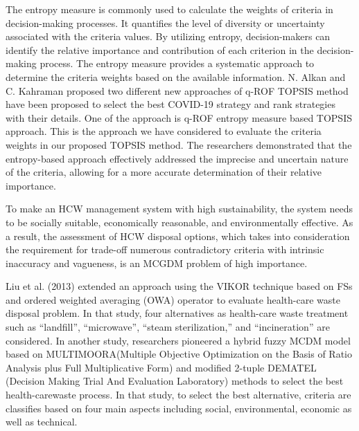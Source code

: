 \begin{flushleft}
\vspace{5mm}

The entropy measure is commonly used to calculate the weights of criteria in decision-making processes. It quantifies the level of diversity or uncertainty associated with the criteria values. By utilizing entropy, decision-makers can identify the relative importance and contribution of each criterion in the decision-making process. The entropy measure provides a systematic approach to determine the criteria weights based on the available information. 
N. Alkan and C. Kahraman\cite{1} proposed two different new approaches of q-ROF TOPSIS
method have been proposed to select the best COVID-19 strategy
and rank strategies with their details. One of the approach is q-ROF entropy measure based TOPSIS approach. This is the approach we have considered to evaluate the criteria weights in our proposed TOPSIS method. The researchers demonstrated that the entropy-based approach effectively addressed the imprecise and uncertain nature of the criteria, allowing for a more accurate determination of their relative importance.

\vspace{5mm}

To make an HCW management system with high
sustainability, the system needs to be socially suitable, economically
reasonable, and environmentally effective\cite{8}. As a result, the assessment of HCW disposal options,
which takes into consideration the requirement for trade-off
numerous contradictory criteria with intrinsic inaccuracy and
vagueness, is an MCGDM problem of high importance.

Liu et al. (2013)\cite{6} extended an approach using the VIKOR technique
based on FSs and ordered weighted averaging (OWA) operator to
evaluate health-care waste disposal problem. In that study, four
alternatives as health-care waste treatment such as “landfill”, “microwave”,
“steam sterilization,” and “incineration” are considered. In
another study, researchers pioneered a hybrid fuzzy MCDM
model based on MULTIMOORA(Multiple Objective Optimization on the Basis of Ratio Analysis plus
Full Multiplicative Form) and modified 2-tuple DEMATEL (Decision
Making Trial And Evaluation Laboratory) methods to
select the best health-carewaste process. In that study, to select the
best alternative, criteria are classifies based on four main aspects
including social, environmental, economic as well as technical. 

\vspace{5mm}


\end{flushleft}
